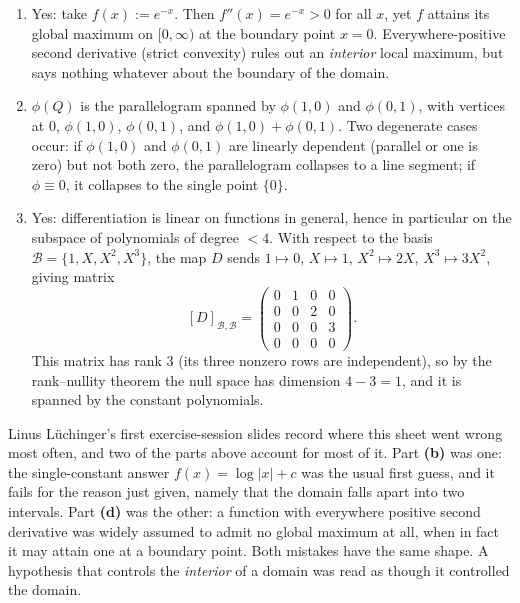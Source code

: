 \begin{exercisesolution}
\begin{enumerate}[label=\textbf{(\alph*)}]
    of variables formula, which the change-of-variables theorem
    (\cref{sec:change_of_variables}) generalizes to $\mathbb{R}^n$.
  \item Yes: take $f(x) := e^{-x}$. Then $f''(x) = e^{-x} > 0$ for all $x$, yet $f$ attains its
    global maximum on $[0,\infty)$ at the boundary point $x=0$. Everywhere-positive second
    derivative (strict convexity) rules out an \emph{interior} local maximum, but says nothing
    whatever about the boundary of the domain.
  \item $\phi(Q)$ is the parallelogram spanned by $\phi(1,0)$ and $\phi(0,1)$, with vertices at
    $0$, $\phi(1,0)$, $\phi(0,1)$, and $\phi(1,0)+\phi(0,1)$. Two degenerate cases occur: if
    $\phi(1,0)$ and $\phi(0,1)$ are linearly dependent (parallel or one is zero) but not both
    zero, the parallelogram collapses to a line segment; if $\phi \equiv 0$, it collapses to the
    single point $\{0\}$.
  \item Yes: differentiation is linear on functions in general, hence in particular on the
    subspace of polynomials of degree $< 4$. With respect to the basis
    $\mathcal{B} = \{1, X, X^2, X^3\}$, the map $D$ sends $1 \mapsto 0$, $X \mapsto 1$,
    $X^2 \mapsto 2X$, $X^3 \mapsto 3X^2$, giving matrix
    \[
      [D]_{\mathcal{B},\mathcal{B}} =
      \begin{pmatrix} 0&1&0&0 \\ 0&0&2&0 \\ 0&0&0&3 \\ 0&0&0&0 \end{pmatrix}.
    \]
    This matrix has rank $3$ (its three nonzero rows are independent), so by the rank--nullity
    theorem the null space has dimension $4 - 3 = 1$, and it is spanned by the constant
    polynomials.
\end{enumerate}
\end{exercisesolution}

\begin{remark}
Linus Lüchinger's first exercise-session slides record where this sheet went wrong most often, and
two of the parts above account for most of it. Part \textbf{(b)} was one: the single-constant
answer $f(x) = \log\lvert x\rvert + c$ was the usual first guess, and it fails for the reason just
given, namely that the domain falls apart into two intervals. Part \textbf{(d)} was the other: a
function with
everywhere positive second derivative was widely assumed to admit no global maximum at all, when
in fact it may attain one at a boundary point. Both mistakes have the same shape. A hypothesis
that controls the \emph{interior} of a domain was read as though it controlled the domain.
\end{remark}

